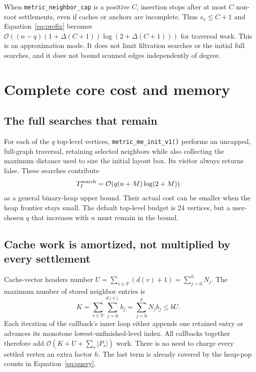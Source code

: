 \documentclass[11pt,a4paper]{article}
\newcommand{\bigO}{\mathcal O}
\newcommand{\code}[1]{\texttt{#1}}
\begin{document}
When \code{metric\_neighbor\_cap} is a positive $C$, insertion stops after at
most $C$ non-root settlements, even if caches or anchors are incomplete. Thus
$s_v\leq C+1$ and Equation~\eqref{eq:prefix} becomes
$\bigO((n-q)(1+\Delta(C+1))\log(2+\Delta(C+1)))$ for traversal work. This is
an approximation mode. It does not limit filtration searches or the initial
full searches, and it does not bound scanned edges independently of degree.

\clearpage
\section{Complete core cost and memory}

\subsection{The full searches that remain}

For each of the $q$ top-level vertices, \code{metric\_me\_init\_v1()} performs
an uncapped, full-graph traversal, retaining selected neighbors while also
collecting the maximum distance used to size the initial layout box. Its visitor
always returns false. These searches contribute
\begin{equation}
 T_I^{\rm search}=\bigO\!\left(q(n+M)\log(2+M)\right)
 \label{eq:initial}
\end{equation}
as a general binary-heap upper bound. Their actual cost can be smaller when
the heap frontier stays small. The default top-level budget is 24 vertices, but a user-chosen
$q$ that increases with $n$ must remain in the bound.

\subsection{Cache work is amortized, not multiplied by every settlement}

Cache-vector headers number
$U=\sum_{v\in V}(d(v)+1)=\sum_{j=0}^{h}N_j$. The maximum number of stored
neighbor entries is
\begin{equation}
 K=\sum_{v\in V}\sum_{j=0}^{d(v)}b_j
   =\sum_{j=0}^{h}N_jb_j\leq bU.
 \label{eq:cache}
\end{equation}
Each iteration of the callback's inner loop either appends one retained entry
or advances its monotone lowest-unfinished-level index. All callbacks together
therefore add $\bigO(K+U+\sum_s |P_s|)$ work. There is no need to charge every
settled vertex an extra factor $h$. The last term is already covered by the
heap-pop counts in Equation~\eqref{eq:query}.
\end{document}
